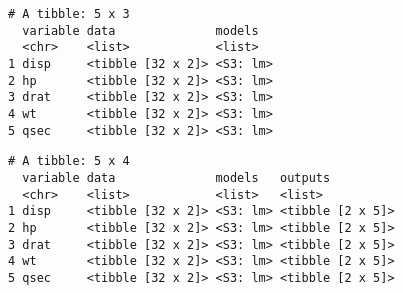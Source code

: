 \documentclass[12pt,letterpaperpaper,openany]{book}
\newenvironment{Shaded}{\begin{snugshade}}{\end{snugshade}}
\newcommand{\DataTypeTok}[1]{\textcolor[rgb]{0.13,0.29,0.53}{#1}}
\newcommand{\KeywordTok}[1]{\textcolor[rgb]{0.13,0.29,0.53}{\textbf{#1}}}
\newcommand{\NormalTok}[1]{#1}
\newcommand{\OperatorTok}[1]{\textcolor[rgb]{0.81,0.36,0.00}{\textbf{#1}}}
\newcommand{\StringTok}[1]{\textcolor[rgb]{0.31,0.60,0.02}{#1}}
\begin{document}
\begin{verbatim}
# A tibble: 5 x 3
  variable data              models  
  <chr>    <list>            <list>  
1 disp     <tibble [32 x 2]> <S3: lm>
2 hp       <tibble [32 x 2]> <S3: lm>
3 drat     <tibble [32 x 2]> <S3: lm>
4 wt       <tibble [32 x 2]> <S3: lm>
5 qsec     <tibble [32 x 2]> <S3: lm>
\end{verbatim}

\begin{Shaded}
\end{Shaded}

\begin{verbatim}
# A tibble: 5 x 4
  variable data              models   outputs         
  <chr>    <list>            <list>   <list>          
1 disp     <tibble [32 x 2]> <S3: lm> <tibble [2 x 5]>
2 hp       <tibble [32 x 2]> <S3: lm> <tibble [2 x 5]>
3 drat     <tibble [32 x 2]> <S3: lm> <tibble [2 x 5]>
4 wt       <tibble [32 x 2]> <S3: lm> <tibble [2 x 5]>
5 qsec     <tibble [32 x 2]> <S3: lm> <tibble [2 x 5]>
\end{verbatim}

\begin{Shaded}
\end{Shaded}
\end{document}
